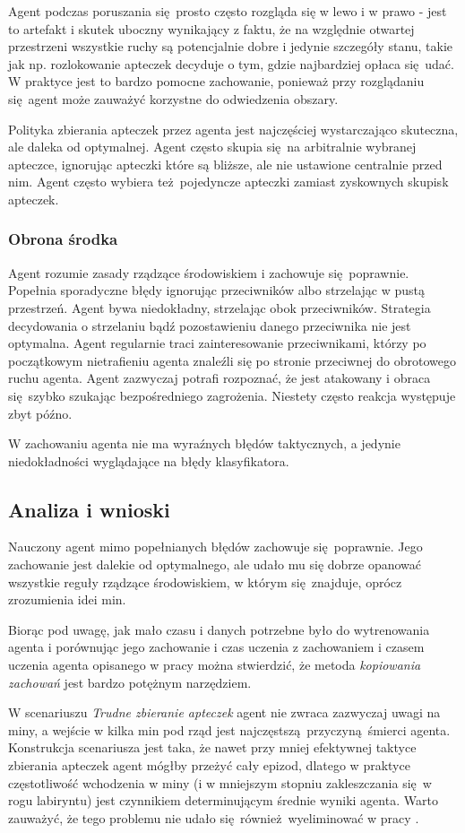 Agent podczas poruszania się prosto często rozgląda się w lewo i w prawo - jest to artefakt i skutek uboczny wynikający z faktu, że na względnie otwartej przestrzeni wszystkie ruchy są potencjalnie dobre i jedynie szczegóły stanu, takie jak np. rozlokowanie apteczek decyduje o tym, gdzie najbardziej opłaca się udać. W praktyce jest to bardzo pomocne zachowanie, ponieważ przy rozglądaniu się agent może zauważyć korzystne do odwiedzenia obszary.

Polityka zbierania apteczek przez agenta jest najczęściej wystarczająco skuteczna, ale daleka od optymalnej. Agent często skupia się na arbitralnie wybranej apteczce, ignorując apteczki które są bliższe, ale nie ustawione centralnie przed nim. Agent często wybiera też pojedyncze apteczki zamiast zyskownych skupisk apteczek.

\subsubsection{Obrona środka}
Agent rozumie zasady rządzące środowiskiem i zachowuje się poprawnie. Popełnia sporadyczne błędy ignorując przeciwników albo strzelając w pustą przestrzeń. Agent bywa niedokładny, strzelając obok przeciwników. Strategia decydowania o strzelaniu bądź pozostawieniu danego przeciwnika nie jest optymalna. Agent regularnie traci zainteresowanie przeciwnikami, którzy po początkowym nietrafieniu agenta znaleźli się po stronie przeciwnej do obrotowego ruchu agenta. Agent zazwyczaj potrafi rozpoznać, że jest atakowany i obraca się szybko szukając bezpośredniego zagrożenia. Niestety często reakcja występuje zbyt późno.

W zachowaniu agenta nie ma wyraźnych błędów taktycznych, a jedynie niedokładności wyglądające na błędy klasyfikatora.

\subsection{Analiza i wnioski}
Nauczony agent mimo popełnianych błędów zachowuje się poprawnie. Jego zachowanie jest dalekie od optymalnego, ale udało mu się dobrze opanować wszystkie reguły rządzące środowiskiem, w którym się znajduje, oprócz zrozumienia idei min.

Biorąc pod uwagę, jak mało czasu i danych potrzebne było do wytrenowania agenta i porównując jego zachowanie i czas uczenia z zachowaniem i czasem uczenia agenta opisanego w pracy \cite{DBLP:journals/corr/KempkaWRTJ16} można stwierdzić, że metoda \textit{kopiowania zachowań} jest bardzo potężnym narzędziem. 

W scenariuszu \textit{Trudne zbieranie apteczek} agent nie zwraca zazwyczaj uwagi na miny, a wejście w kilka min pod rząd jest najczęstszą przyczyną śmierci agenta. Konstrukcja scenariusza jest taka, że nawet przy mniej efektywnej taktyce zbierania apteczek agent mógłby przeżyć cały epizod, dlatego w praktyce częstotliwość wchodzenia w miny (i w mniejszym stopniu zakleszczania się w rogu labiryntu) jest czynnikiem determinującym średnie wyniki agenta. Warto zauważyć, że tego problemu nie udało się również wyeliminować w pracy \cite{DBLP:journals/corr/KempkaWRTJ16}.
